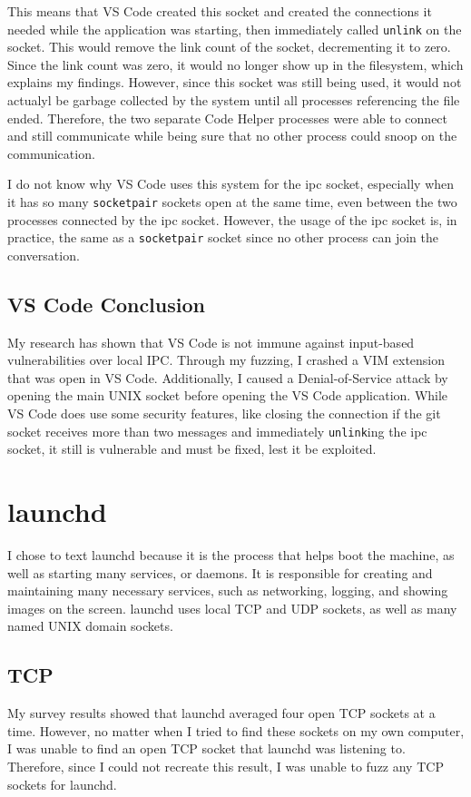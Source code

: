 This means that VS Code created this socket and created the connections it needed while the application was starting, then immediately called \texttt{unlink} on the socket.  This would remove the link count of the socket, decrementing it to zero.  Since the link count was zero, it would no longer show up in the filesystem, which explains my findings.  However, since this socket was still being used, it would not actualyl be garbage collected by the system until all processes referencing the file ended.  Therefore, the two separate Code Helper processes were able to connect and still communicate while being sure that no other process could snoop on the communication.

I do not know why VS Code uses this system for the ipc socket, especially when it has so many \texttt{socketpair} sockets open at the same time, even between the two processes connected by the ipc socket.  However, the usage of the ipc socket is, in practice, the same as a \texttt{socketpair} socket since no other process can join the conversation.

\subsection{VS Code Conclusion}
\label{sec:codeConclusion}
My research has shown that VS Code is not immune against input-based vulnerabilities over local IPC.  Through my fuzzing, I crashed a VIM extension that was open in VS Code.  Additionally, I caused a Denial-of-Service attack by opening the main UNIX socket before opening the VS Code application.  While VS Code does use some security features, like closing the connection if the git socket receives more than two messages and immediately \texttt{unlink}ing the ipc socket, it still is vulnerable and must be fixed, lest it be exploited.

\section{launchd}
\label{sec:launchd}
I chose to text launchd because it is the process that helps boot the machine, as well as starting many services, or daemons.  It is responsible for creating and maintaining many necessary services, such as networking, logging, and showing images on the screen.  launchd uses local TCP and UDP sockets, as well as many named UNIX domain sockets.

\subsection{TCP}
\label{sec:launchdTcp}
My survey results showed that launchd averaged four open TCP sockets at a time.  However, no matter when I tried to find these sockets on my own computer, I was unable to find an open TCP socket that launchd was listening to.  Therefore, since I could not recreate this result, I was unable to fuzz any TCP sockets for launchd.

